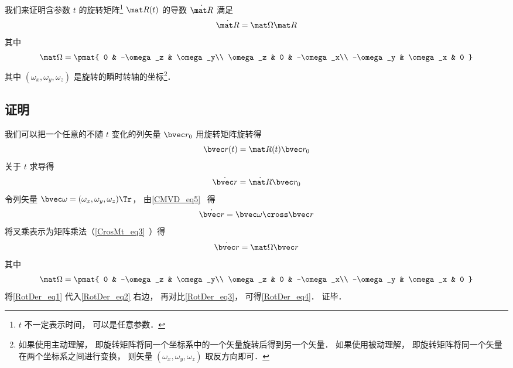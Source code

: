 

我们来证明含参数 $t$ 的旋转矩阵\footnote{$t$ 不一定表示时间， 可以是任意参数．} $\mat R(t)$ 的导数 $\dot{\mat R}$ 满足
\begin{equation}\label{RotDer_eq4}
\dot{\mat R} = \mat \Omega \mat R
\end{equation}
其中
\begin{equation}
\mat \Omega = \pmat{
0 & -\omega_z & \omega_y\\
\omega_z & 0 & -\omega_x\\
-\omega_y & \omega_x & 0
}
\end{equation}
其中 $(\omega_x, \omega_y, \omega_z)$ 是旋转的瞬时转轴的坐标\footnote{如果使用主动理解， 即旋转矩阵将同一个坐标系中的一个矢量旋转后得到另一个矢量． 如果使用被动理解， 即旋转矩阵将同一个矢量在两个坐标系之间进行变换， 则矢量 $(\omega_x, \omega_y, \omega_z)$ 取反方向即可．}．%

\subsection{证明}
我们可以把一个任意的不随 $t$ 变化的列矢量 $\bvec r_0$ 用旋转矩阵旋转得
\begin{equation}\label{RotDer_eq1}
\bvec r(t) = \mat R(t) \bvec r_0
\end{equation}
关于 $t$ 求导得
\begin{equation}\label{RotDer_eq3}
\dot{\bvec r} = \dot{\mat R} \bvec r_0
\end{equation}
令列矢量 $\bvec \omega = (\omega_x, \omega_y, \omega_z)\Tr$， 由\autoref{CMVD_eq5}~ 得
\begin{equation}\label{RotDer_eq5}
\dot{\bvec r} = \bvec\omega \cross \bvec r
\end{equation}
将叉乘表示为矩阵乘法（\autoref{CrosMt_eq3}~）得
\begin{equation}\label{RotDer_eq2}
\dot{\bvec r} = \mat\Omega \bvec r
\end{equation}
其中
\begin{equation}
\mat \Omega = \pmat{
0 & -\omega_z & \omega_y\\
\omega_z & 0 & -\omega_x\\
-\omega_y & \omega_x & 0
}\end{equation}
将\autoref{RotDer_eq1} 代入\autoref{RotDer_eq2} 右边， 再对比\autoref{RotDer_eq3}， 可得\autoref{RotDer_eq4}． 证毕．

